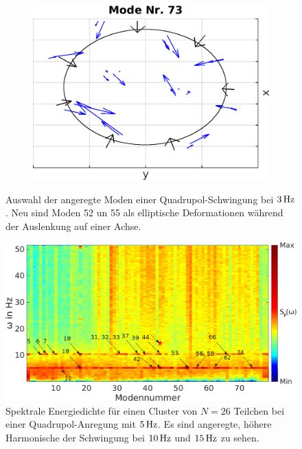 \documentclass[numbers=noenddot,a4paper,notitlepage,twoside,BCOR15mm]{scrbook}
\begin{document}
\begin{figure}[!t]
\begin{subfigure}[t]{0.325\textwidth}
									\includegraphics[width=\textwidth,height=0.7\textwidth]{figs/auswertung/manipulation/quadrupol3HzModeNr73.png}
								\end{subfigure}
								\caption{Auswahl der angeregte Moden einer Quadrupol-Schwingung bei $\unit[3]{Hz}$. Neu sind Moden 52 un 55 als elliptische Deformationen während der Auslenkung auf einer Achse.}\label{img:modenquadrupol3Hz}
							\end{figure}

							\begin{figure}[!h]
								\centering
								\includegraphics[width=\textwidth]{figs/auswertung/manipulation/quadrupol5Hzpowerdens.png}
								\caption{Spektrale Energiedichte für einen Cluster von $N=26$ Teilchen bei einer Quadrupol-Anregung mit $\unit[5]{Hz}$. Es sind angeregte, höhere Harmonische der Schwingung bei $\unit[10]{Hz}$  und $\unit[15]{Hz}$ zu sehen.}\label{img:powerdensquadrupol5Hz}
							\end{figure}
\end{document}
